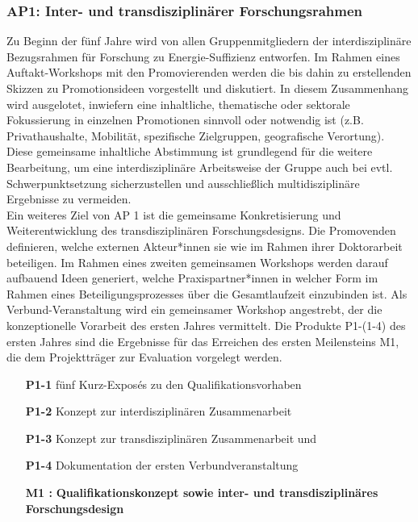 \documentclass[a4paper,11pt,twoside]{scrartcl}
\begin{document}
\subsubsection*{AP1: Inter- und transdisziplinärer Forschungsrahmen}
Zu Beginn der fünf Jahre wird von allen Gruppenmitgliedern der interdisziplinäre Bezugsrahmen für Forschung zu Energie-Suffizienz entworfen. Im Rahmen eines Auftakt-Workshops mit den Promovierenden werden die bis dahin zu erstellenden Skizzen zu Promotionsideen vorgestellt und diskutiert.
In diesem Zusammenhang wird ausgelotet, inwiefern eine inhaltliche, thematische oder sektorale Fokussierung in einzelnen Promotionen sinnvoll oder notwendig ist (z.B. Privathaushalte, Mobilität, spezifische Zielgruppen, geografische Verortung). Diese gemeinsame inhaltliche Abstimmung ist grundlegend für die weitere Bearbeitung, um eine interdisziplinäre Arbeitsweise der Gruppe auch bei evtl. Schwerpunktsetzung sicherzustellen und ausschließlich multidisziplinäre Ergebnisse zu vermeiden.\\
Ein weiteres Ziel von AP 1 ist die gemeinsame Konkretisierung und Weiterentwicklung des transdisziplinären Forschungsdesigns. 
Die Promovenden definieren, welche externen Akteur*innen sie wie im Rahmen ihrer Doktorarbeit beteiligen.
Im Rahmen eines zweiten gemeinsamen Workshops werden darauf aufbauend Ideen generiert, welche Praxispartner*innen in welcher Form im Rahmen eines Beteiligungsprozesses über die Gesamtlaufzeit einzubinden ist.
Als Verbund-Veranstaltung wird ein gemeinsamer Workshop angestrebt, der die konzeptionelle Vorarbeit des ersten Jahres vermittelt.
Die Produkte P1-(1-4) des ersten Jahres sind die Ergebnisse für das Erreichen des ersten Meilensteins M1, die dem Projektträger zur Evaluation vorgelegt werden.
\begin{itemize}
    \item[\textbf{P1-1}] fünf Kurz-Exposés zu den Qualifikationsvorhaben 
    \item[\textbf{P1-2}] Konzept zur interdisziplinären Zusammenarbeit
    \item[\textbf{P1-3}] Konzept zur transdisziplinären Zusammenarbeit und
    \item[\textbf{P1-4}] Dokumentation der ersten Verbundveranstaltung
    \item[\textbf{M1 :}] \textbf{Qualifikationskonzept sowie inter- und transdisziplinäres Forschungsdesign}
\end{itemize}
\end{document}
